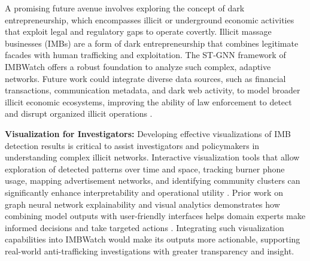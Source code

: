 \documentclass[letterpaper]{article} %
\begin{document}
A promising future avenue involves exploring the concept of dark entrepreneurship, which encompasses illicit or underground economic activities that exploit legal and regulatory gaps to operate covertly. Illicit massage businesses (IMBs) are a form of dark entrepreneurship that combines legitimate facades with human trafficking and exploitation. The ST-GNN framework of IMBWatch offers a robust foundation to analyze such complex, adaptive networks. Future work could integrate diverse data sources, such as financial transactions, communication metadata, and dark web activity, to model broader illicit economic ecosystems, improving the ability of law enforcement to detect and disrupt organized illicit operations \cite{dark_entrepreneurship2021}.

\textbf{Visualization for Investigators:} Developing effective visualizations of IMB detection results is critical to assist investigators and policymakers in understanding complex illicit networks. Interactive visualization tools that allow exploration of detected patterns over time and space, tracking burner phone usage, mapping advertisement networks, and identifying community clusters can significantly enhance interpretability and operational utility \cite{ying2019gnnexplainer, robinson2021visual, chen2023gnn}. Prior work on graph neural network explainability and visual analytics demonstrates how combining model outputs with user-friendly interfaces helps domain experts make informed decisions and take targeted actions \cite{ribeiro2016why, kerren2014visual}. Integrating such visualization capabilities into IMBWatch would make its outputs more actionable, supporting real-world anti-trafficking investigations with greater transparency and insight.
\end{document}
